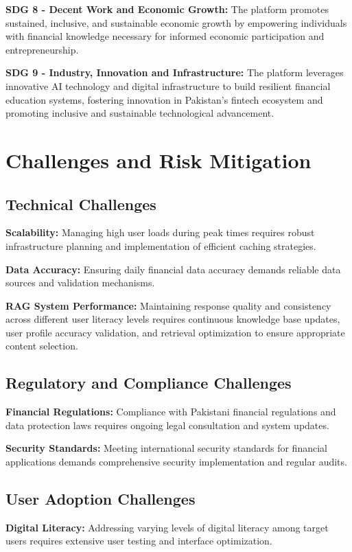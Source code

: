 \documentclass[12pt]{article}
\begin{document}
\textbf{SDG 8 - Decent Work and Economic Growth:}
The platform promotes sustained, inclusive, and sustainable economic growth by empowering individuals with financial knowledge necessary for informed economic participation and entrepreneurship.

\textbf{SDG 9 - Industry, Innovation and Infrastructure:}
The platform leverages innovative AI technology and digital infrastructure to build resilient financial education systems, fostering innovation in Pakistan's fintech ecosystem and promoting inclusive and sustainable technological advancement.

\section{Challenges and Risk Mitigation}
\subsection{Technical Challenges}
\textbf{Scalability:} Managing high user loads during peak times requires robust infrastructure planning and implementation of efficient caching strategies.

\textbf{Data Accuracy:} Ensuring daily financial data accuracy demands reliable data sources and validation mechanisms.

\textbf{RAG System Performance:} Maintaining response quality and consistency across different user literacy levels requires continuous knowledge base updates, user profile accuracy validation, and retrieval optimization to ensure appropriate content selection.

\subsection{Regulatory and Compliance Challenges}

\textbf{Financial Regulations:} Compliance with Pakistani financial regulations and data protection laws requires ongoing legal consultation and system updates.

\textbf{Security Standards:} Meeting international security standards for financial applications demands comprehensive security implementation and regular audits.

\subsection{User Adoption Challenges}

\textbf{Digital Literacy:} Addressing varying levels of digital literacy among target users requires extensive user testing and interface optimization.
\end{document}
